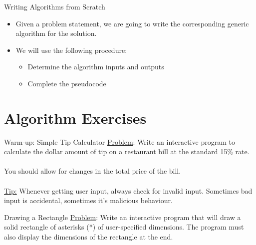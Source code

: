 \documentclass[graphics]{beamer}
\begin{document}
\begin{frame}{Writing Algorithms from Scratch}
    \begin{itemize}
        \item Given a problem statement, we are going to write the corresponding generic algorithm for the solution.
        \item We will use the following procedure:
        \begin{itemize}
            \item Determine the algorithm inputs and outputs
            \item Complete the pseudocode
        \end{itemize}
    \end{itemize}
\end{frame}

\section*{Algorithm Exercises}
\begin{frame}{Warm-up: Simple Tip Calculator}
    \underline{Problem}:  Write an interactive program to calculate the dollar amount of tip on a restaurant bill at the standard 15\% rate.
    \\ ~~ \\
	You should allow for changes in the total price of the bill. \\ ~~ \\
	\underline{Tip:} Whenever getting user input, always check for invalid input. Sometimes bad input is accidental, sometimes it's malicious behaviour.
\end{frame}

\begin{frame}{Drawing a Rectangle}
    \underline{Problem}:  Write an interactive program that will draw a solid rectangle of asterisks (*) of user-specified dimensions.  The program must also display the dimensions of the rectangle at the end. 
\end{frame}
\end{document}
